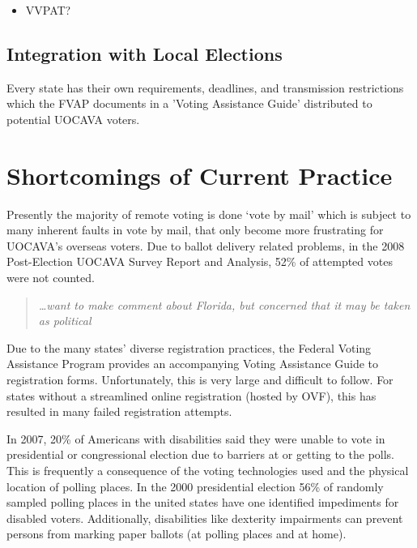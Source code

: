 \begin{itemize}
\item VVPAT?
\end{itemize}

\subsection{Integration with Local Elections}

Every state has their own requirements, deadlines, and transmission restrictions which the FVAP documents in a 'Voting Assistance Guide' distributed to potential UOCAVA voters. 

\section{Shortcomings of Current Practice}

Presently the majority of remote voting is done `vote by mail'  which is subject to many inherent faults in vote by mail, that only become more frustrating for UOCAVA's overseas voters. Due to ballot delivery related problems, in the 2008 Post-Election UOCAVA Survey Report and Analysis, 52\% of attempted votes were not counted. \begin{quote} {\em \ldots want to make comment about Florida, but concerned that it may be taken as political}\end{quote}

Due to the many states' diverse registration practices, the Federal Voting Assistance Program provides an accompanying Voting Assistance Guide to registration forms. Unfortunately, this is very large and difficult to follow. For states without a streamlined online registration (hosted by OVF), this has resulted in many failed registration attempts.


In 2007, 20\% of Americans with disabilities said they were unable to vote in presidential or congressional election due to barriers at or getting to the polls. This is frequently a consequence of the voting technologies used and the physical location of polling places. In the 2000 presidential election 56\% of randomly sampled polling places in the united states have one identified impediments for disabled voters. Additionally, disabilities like dexterity impairments can prevent persons from marking paper ballots (at polling places and at home).

